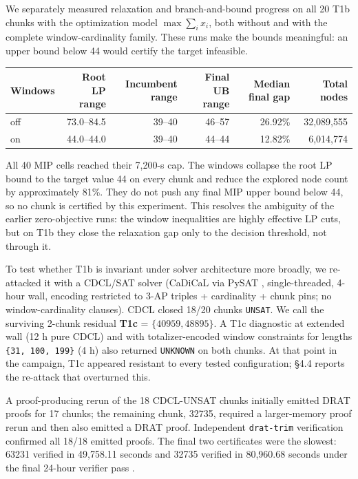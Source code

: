 We separately measured relaxation and branch-and-bound progress on all 20
T1b chunks with the optimization model $\max\sum_i x_i$, both without and
with the complete window-cardinality family. These runs make the bounds
meaningful: an upper bound below 44 would certify the target infeasible.

{\def\LTcaptype{none} %
\begin{longtable}[]{@{}lrrrrr@{}}
\toprule\noalign{}
Windows & Root LP range & Incumbent range & Final UB range & Median final gap & Total nodes \\
\midrule\noalign{}
\endhead
\bottomrule\noalign{}
\endlastfoot
off & 73.0--84.5 & 39--40 & 46--57 & 26.92\% & 32,089,555 \\
on & 44.0--44.0 & 39--40 & 44--44 & 12.82\% & 6,014,774 \\
\end{longtable}
}

All 40 MIP cells reached their 7,200-s cap. The windows collapse the root LP
bound to the target value 44 on every
chunk and reduce the explored node count by approximately 81\%. They do not
push any final MIP upper bound below 44, so no chunk is certified by this
experiment. This resolves the ambiguity of the earlier zero-objective runs:
the window inequalities are highly effective LP cuts, but on T1b they close
the relaxation gap only to the decision threshold, not through it.

To test whether T1b is invariant under solver architecture more broadly, we
re-attacked it with a CDCL/SAT solver (CaDiCaL via PySAT
\cite{biere-cadical,pysat-2018}, single-threaded,
4-hour wall, encoding restricted to 3-AP triples + cardinality + chunk pins;
no window-cardinality clauses). CDCL closed 18/20 chunks \texttt{UNSAT}. We call
the surviving 2-chunk residual \textbf{T1c} = $\{40959, 48895\}$. A T1c diagnostic
at extended wall (12 h pure CDCL) and with totalizer-encoded window
constraints for lengths \texttt{\{31,\ 100,\ 199\}} (4 h) also returned \texttt{UNKNOWN} on
both chunks. At that point in the campaign, T1c appeared resistant to
every tested configuration; §4.4 reports the re-attack that overturned this.

A proof-producing rerun of the 18 CDCL-UNSAT chunks initially emitted DRAT
proofs for 17 chunks; the remaining chunk, 32735, required a larger-memory
proof rerun and then also emitted a DRAT proof. Independent \texttt{drat-trim}
verification confirmed all 18/18 emitted proofs. The final two certificates
were the slowest: 63231 verified in 49,758.11 seconds and 32735 verified
in 80,960.68 seconds under the final 24-hour verifier pass
\cite{heule-hunt-biere-drat-2014,cruz-filipe-lrat-2017}.

